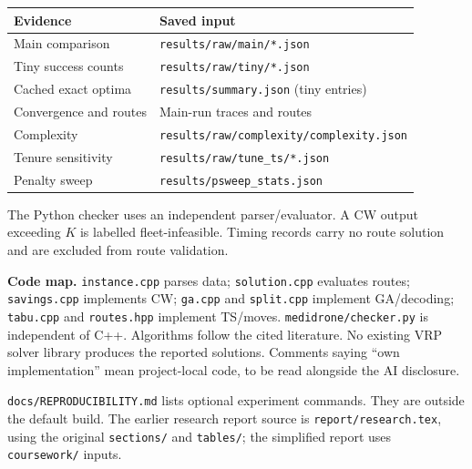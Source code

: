 \begin{center}\small
\begin{tabularx}{\linewidth}{@{}lX@{}}\toprule
Evidence & Saved input \\\midrule
Main comparison & \texttt{results/raw/main/*.json} \\
Tiny success counts & \texttt{results/raw/tiny/*.json} \\
Cached exact optima & \texttt{results/summary.json} (tiny entries) \\
Convergence and routes & Main-run traces and routes \\
Complexity & \texttt{results/raw/complexity/complexity.json} \\
Tenure sensitivity & \texttt{results/raw/tune\_ts/*.json} \\
Penalty sweep & \texttt{results/psweep\_stats.json} \\\bottomrule
\end{tabularx}\end{center}

The Python checker uses an independent parser/evaluator. A CW output exceeding $K$ is labelled
fleet-infeasible. Timing records carry no route solution and are excluded from route validation.

\textbf{Code map.} \texttt{instance.cpp} parses data; \texttt{solution.cpp} evaluates routes;
\texttt{savings.cpp} implements CW; \texttt{ga.cpp} and \texttt{split.cpp} implement GA/decoding;
\texttt{tabu.cpp} and \texttt{routes.hpp} implement TS/moves. \texttt{medidrone/checker.py}
is independent of C++. Algorithms follow the cited literature. No existing VRP solver library
produces the reported solutions. Comments saying ``own implementation'' mean project-local
code, to be read alongside the AI disclosure.

\texttt{docs/REPRODUCIBILITY.md} lists optional experiment commands. They are outside the default
build. The earlier research report source is \texttt{report/research.tex}, using the original
\texttt{sections/} and \texttt{tables/}; the simplified report uses \texttt{coursework/} inputs.
